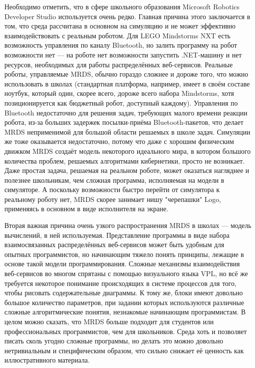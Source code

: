 \documentclass[a4paper]{article}
\begin{document}
Необходимо отметить, что в сфере школьного образования Microsoft Robotics Developer Studio используется очень редко. Главная причина этого заключается в том, что среда рассчитана в основном на симуляцию и не может эффективно взаимодействовать с реальным роботом. Для LEGO Mindstorms NXT есть возможность управления по каналу Bluetooth, но залить программу на робот возможности нет --- на роботе нет возможности запустить .NET-машину и нет ресурсов, необходимых для работы распределённых веб-сервисов. Реальные роботы, управляемые MRDS, обычно гораздо сложнее и дороже того, что можно использовать в школах (стандартная платформа, например, имеет в своём составе ноутбук, который один, скорее всего, дороже всего набора Mindstorms, хотя позиционируется как бюджетный робот, доступный каждому). Управления по Bluetooth недостаточно для решения задач, требующих малого времени реакции робота, из-за больших задержек посылки-приёма Bluetooth-пакетов, что делает MRDS неприменимой для большой области решаемых в школе задач. Симуляции же тоже оказывается недостаточно, потому что даже с хорошим физическим движком MRDS создаёт модель некоторого идеального мира, в котором большого количества проблем, решаемых алгоритмами кибернетики, просто не возникает. Даже простая задача, решаемая на реальном роботе, может оказаться нагляднее и полезнее школьникам, чем сложная программа, исполняемая на модели в симуляторе. А поскольку возможности быстро перейти от симулятора к реальному роботу нет, MRDS скорее занимает нишу "черепашки" Logo, применяясь в основном в виде исполнителя на экране.

Вторая важная причина очень узкого распространения MRDS в школах --- модель вычислений, в ней используемая. Представление программы в виде набора взаимосвязанных распределённых веб-сервисов может быть удобным для опытных программистов, но начинающим тяжело понять принципы, лежащие в основе такой модели программирования. Сложные механизмы взаимодействия веб-сервисов во многом спрятаны с помощью визуального языка VPL, но всё же требуется некоторое понимание происходящих в системе процессов для того, чтобы рисовать содержательные диаграммы. К тому же, блоки имеют довольно большое количество параметров, при задании которых используются различные сложные алгоритмические понятия, незнакомые начинающим программистам. В целом можно сказать, что MRDS больше подходит для студентов или профессиональных программистов, чем для школьников. Среда хоть и позволяет писать сколь угодно сложные программы, но делать это можно довольно нетривиальным и специфическим образом, что сильно снижает её ценность как иллюстративного материала.
\end{document}
